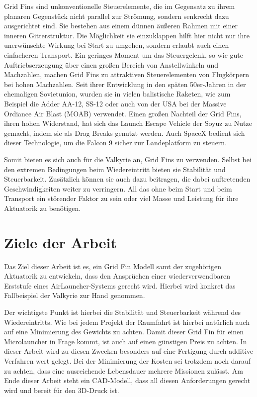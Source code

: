 Grid Fins sind unkonventionelle Steuerelemente, die im Gegensatz zu ihrem planaren Gegenstück nicht parallel zur Strömung, sondern senkrecht dazu ausgerichtet sind. Sie bestehen aus einem dünnen äußeren Rahmen mit einer inneren Gitterstruktur. Die Möglichkeit sie einzuklappen hilft hier nicht nur ihre unerwünschte Wirkung bei Start zu umgehen, sondern erlaubt auch einen einfacheren Transport. Ein geringes Moment um das Steuergelenk, so wie gute Auftriebserzeugung über einen großen Bereich von Anstellwinkeln und Machzahlen, machen Grid Fins zu attraktiven Steuerelementen von Flugkörpern bei hohen Machzahlen.
Seit ihrer Entwicklung in den späten 50er-Jahren in der ehemaligen Sovietunion, wurden sie in vielen balistische Raketen, wie zum Beispiel die Adder AA-12, SS-12 oder auch von der USA bei der Massive Ordiance Air Blast (MOAB) verwendet. Einen großen Nachteil der Grid Fins, ihren hohen Widerstand, hat sich das Launch Escape Vehicle der Soyuz zu Nutze gemacht, indem sie als Drag Breaks genutzt werden. Auch SpaceX bedient sich dieser Technologie, um die Falcon 9 sicher zur Landeplatform zu steuern.

Somit bieten es sich auch für die Valkyrie an, Grid Fins zu verwenden. Selbst bei den extremen Bedingungen beim Wiedereintritt bieten sie Stabilität und Steuerbarkeit. Zusätzlich können sie auch dazu beitragen, die dabei auftretenden Geschwindigkeiten weiter zu verringern. All das ohne beim Start und beim Transport ein störender Faktor zu sein oder viel Masse und Leistung für ihre Aktuatorik zu benötigen.

\section{Ziele der Arbeit}
Das Ziel dieser Arbeit ist es, ein Grid Fin Modell samt der zugehörigen Aktuatorik zu entwickeln, dass den Ansprüchen einer wiederverwendbaren Erststufe eines AirLauncher-Systems gerecht wird. Hierbei wird konkret das Fallbeispiel der Valkyrie zur Hand genommen.

Der wichtigste Punkt ist hierbei die Stabilität und Steuerbarkeit während des Wiedereintritts. Wie bei jedem Projekt der Raumfahrt ist hierbei natürlich auch auf eine Minimierung des Gewichts zu achten. Damit dieser Grid Fin für einen Microlauncher in Frage kommt, ist auch auf einen günstigen Preis zu achten. In dieser Arbeit wird zu diesen Zwecken besonders auf eine Fertigung durch additive Verfahren wert gelegt. Bei der Minimierung der Kosten sei trotzdem noch darauf zu achten, dass eine ausreichende Lebensdauer mehrere Missionen zulässt. Am Ende dieser Arbeit steht ein CAD-Modell, dass all diesen Anforderungen gerecht wird und bereit für den 3D-Druck ist.

